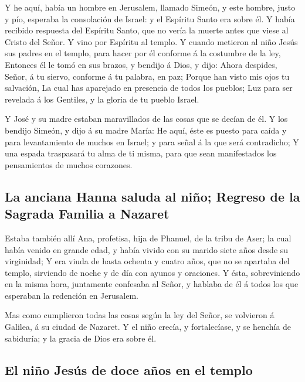  Y he aquí, había un hombre en Jerusalem, llamado Simeón,
y este hombre, justo y pío, esperaba la consolación de Israel: y el
Espíritu Santo era sobre él.  Y había recibido respuesta
del Espíritu Santo, que no vería la muerte antes que viese al Cristo del
Señor.  Y vino por Espíritu al templo. Y cuando metieron
al niño Jesús sus padres en el templo, para hacer por él conforme á la
costumbre de la ley,  Entonces él le tomó en sus brazos,
y bendijo á Dios, y dijo:  Ahora despides, Señor, á tu
siervo, conforme á tu palabra, en paz;  Porque han visto
mis ojos tu salvación,  La cual has aparejado en
presencia de todos los pueblos;  Luz para ser revelada á
los Gentiles, y la gloria de tu pueblo Israel.

 Y José y su madre estaban maravillados de las cosas que
se decían de él.  Y los bendijo Simeón, y dijo á su madre
María: He aquí, éste es puesto para caída y para levantamiento de muchos
en Israel; y para señal á la que será contradicho;  Y una
espada traspasará tu alma de ti misma, para que sean manifestados los
pensamientos de muchos corazones.

\hypertarget{la-anciana-hanna-saluda-al-niuxf1o-regreso-de-la-sagrada-familia-a-nazaret}{%
\subsection{La anciana Hanna saluda al niño; Regreso de la Sagrada
Familia a
Nazaret}\label{la-anciana-hanna-saluda-al-niuxf1o-regreso-de-la-sagrada-familia-a-nazaret}}

 Estaba también allí Ana, profetisa, hija de Phanuel, de
la tribu de Aser; la cual había venido en grande edad, y había vivido
con su marido siete años desde su virginidad;  Y era
viuda de hasta ochenta y cuatro años, que no se apartaba del templo,
sirviendo de noche y de día con ayunos y oraciones.  Y
ésta, sobreviniendo en la misma hora, juntamente confesaba al Señor, y
hablaba de él á todos los que esperaban la redención en Jerusalem.

 Mas como cumplieron todas las cosas según la ley del
Señor, se volvieron á Galilea, á su ciudad de Nazaret.  Y
el niño crecía, y fortalecíase, y se henchía de sabiduría; y la gracia
de Dios era sobre él.

\hypertarget{el-niuxf1o-jesuxfas-de-doce-auxf1os-en-el-templo}{%
\subsection{El niño Jesús de doce años en el
templo}\label{el-niuxf1o-jesuxfas-de-doce-auxf1os-en-el-templo}}

